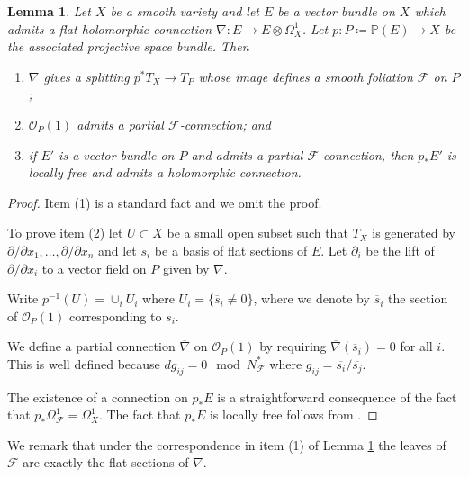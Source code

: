 \documentclass[12pt]{amsart}
\theoremstyle{plain}
\newtheorem{lemma}[theorem]{Lemma}
\theoremstyle{definition}
\begin{document}
\begin{lemma}
\label{lem_flatconnsummary}
Let $X$ be a smooth variety and let $E$ be a vector bundle on $X$ which admits a flat holomorphic connection
$\nabla\colon E \rightarrow E \otimes \Omega^1_X$.
Let $p\colon P \coloneqq  \mathbb P(E) \rightarrow X$ be the associated
projective space bundle.
Then
\begin{enumerate}
\item $\nabla$ gives a splitting $p^*T_X \rightarrow T_P$ whose image defines a smooth foliation $\mathcal F$ on $P$;

\item $\mathcal O_P(1)$ admits a partial $\mathcal F$-connection; and

\item if $E'$ is a vector bundle on $P$ and admits a partial $\mathcal F$-connection, then $p_*E'$
is locally free and admits a holomorphic connection.
\end{enumerate}

\end{lemma}

\begin{proof}
Item (1) is a standard fact and we omit the proof.  

\medskip
To prove item (2) let $U \subset X$ be a small open subset such that $T_X$ is generated by
$\partial/\partial x_1, \dots, \partial/\partial x_n$ 
and let $s_i$ be a basis of flat sections of $E$. 
Let $\partial_i$ be the lift of $\partial/\partial x_i$ to a vector field on $P$ given by $\nabla$.

Write $p^{-1}(U) = \cup_i U_i$ where $U_i = \{\overline{s}_i \neq 0\}$, where we denote
by $\overline{s}_i$ the section of
$\mathcal O_P(1)$ corresponding to $s_i$. 
 
We define a partial connection $\overline{\nabla}$ on $\mathcal O_P(1)$
by requiring $\overline{\nabla}(\overline{s}_i) = 0$ for all $i$.  This is well defined
because $dg_{ij} = 0 \mod N^*_{\mathcal F}$ where 
$g_{ij} = \overline{s_i}/\overline{s_j}$.
\medskip

The existence of a connection on $p_*E$ is a straightforward consequence of the fact that $p_*\Omega^1_{\mathcal F} = \Omega^1_X$.  The fact that $p_*E$ is locally free follows from
\cite[Corollaire 2.5.2.2]{MR1862024}.
\end{proof}


We remark that under the correspondence in item (1) of 
Lemma \ref{lem_flatconnsummary} the leaves of $\mathcal F$ are exactly the flat
sections of $\nabla$.
\end{document}
